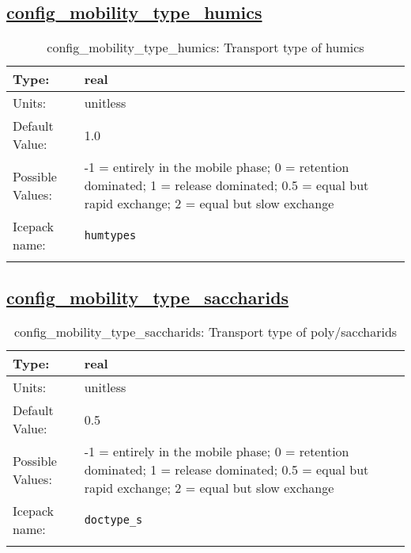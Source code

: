 \subsection[config\_mobility\_type\_humics]{\hyperref[sec:nm_tab_biogeochemistry]{config\_mobility\_type\_humics}}
\label{subsec:nm_sec_config_mobility_type_humics}
\begin{center}
\begin{longtable}{| p{2.0in} || p{4.0in} |}
    \hline
    Type: & real \\
    \hline
    Units: & \si{unitless} \\
    \hline
    Default Value: & 1.0 \\
    \hline
    Possible Values: & -1 = entirely in the mobile phase; 0 = retention dominated; 1 = release dominated; 0.5 = equal but rapid exchange; 2 = equal but slow exchange \\
    \hline
    Icepack name: & \verb+humtypes+ \\
    \hline
    \caption{config\_mobility\_type\_humics: Transport type of humics}
\end{longtable}
\end{center}
\subsection[config\_mobility\_type\_saccharids]{\hyperref[sec:nm_tab_biogeochemistry]{config\_mobility\_type\_saccharids}}
\label{subsec:nm_sec_config_mobility_type_saccharids}
\begin{center}
\begin{longtable}{| p{2.0in} || p{4.0in} |}
    \hline
    Type: & real \\
    \hline
    Units: & \si{unitless} \\
    \hline
    Default Value: & 0.5 \\
    \hline
    Possible Values: & -1 = entirely in the mobile phase; 0 = retention dominated; 1 = release dominated; 0.5 = equal but rapid exchange; 2 = equal but slow exchange \\
    \hline
    Icepack name: & \verb+doctype_s+ \\
    \hline
    \caption{config\_mobility\_type\_saccharids: Transport type of poly/saccharids}
\end{longtable}
\end{center}
